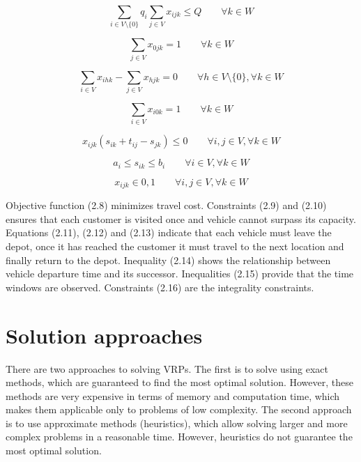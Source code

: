 \documentclass[a4paper,twoside,12pt]{book}
\begin{document}
\begin{equation}
\sum_{i \in V \setminus \lbrace 0 \rbrace}q_{i} \sum_{j \in V}x_{ijk} \leq Q \qquad \forall k \in W
\end{equation}

\begin{equation}
\sum_{j \in V}x_{0jk} = 1 \qquad \forall k \in W
\end{equation}

\begin{equation}
\sum_{i \in V}x_{ihk} -\sum_{j \in V}x_{hjk} = 0 \qquad \forall h \in V \setminus \lbrace 0 \rbrace, \forall k \in W
\end{equation}

\begin{equation}
\sum_{i \in V}x_{i0k} = 1 \qquad \forall k \in W
\end{equation}

\begin{equation}
x_{ijk}(s_{ik}+t_{ij}-s_{jk}) \leq 0 \qquad \forall i,j \in V ,\forall k \in W
\end{equation}

\begin{equation}
a_{i}\leq s_{ik} \leq b_{i} \qquad \forall i \in V ,\forall k \in W
\end{equation}

\begin{equation}
x_{ijk} \in {0,1} \qquad \forall i,j \in V ,\forall k \in W
\end{equation}

Objective function (2.8) minimizes travel cost. Constraints (2.9) and (2.10) ensures that each customer is visited once and vehicle cannot surpass its capacity. Equations (2.11), (2.12) and (2.13) indicate that each vehicle must leave the depot, once it has reached the customer it must travel to the next location and finally return to the depot. Inequality (2.14) shows the relationship between vehicle departure time and its successor. Inequalities (2.15) provide that the time windows are observed. Constraints (2.16) are the integrality constraints. \cite{bib:chapter:VRPTW}

\section{Solution approaches}

There are two approaches to solving VRPs. The first is to solve using exact methods, which are guaranteed to find the most optimal solution. However, these methods are very expensive in terms of memory and computation time, which makes them applicable only to problems of low complexity. The second approach is to use approximate methods (heuristics), which allow solving larger and more complex problems in a reasonable time. However, heuristics do not guarantee the most optimal solution. 
\end{document}
